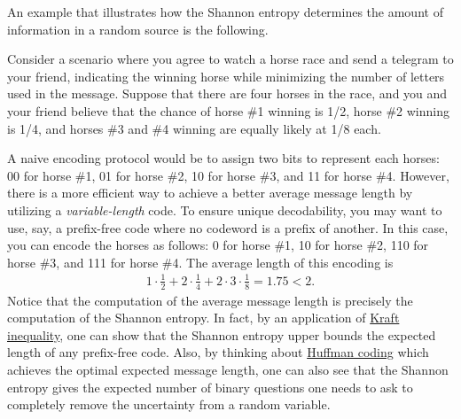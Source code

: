 \begin{example}\leavevmode
	
An example that illustrates how the Shannon entropy determines the amount of information in a random source is the following.
\vspace{0.5em}

Consider a scenario where you agree to watch a horse race and send a telegram to your friend, indicating the winning horse while minimizing the number of letters used in the message. 
Suppose that there are four horses in the race, and you and your friend believe that the chance of horse \#1 winning is 1/2, horse \#2 winning is 1/4, and horses \#3 and \#4 winning are equally likely at 1/8 each.
\vspace{0.5em}

A naive encoding protocol would be to assign two bits to represent each horses: 00 for horse \#1, 01 for horse \#2, 10 for horse \#3, and 11 for horse \#4. However, there is a more efficient way to achieve a better average message length by utilizing a \emph{variable-length} code. To ensure unique decodability, you may want to use, say, a prefix-free code where no codeword is a prefix of another. In this case, you can encode the horses as follows: 0 for horse \#1, 10 for horse \#2, 110 for horse \#3, and 111 for horse \#4. The average length of this encoding is
\begin{align}
	1\cdot \frac{1}{2} + 2\cdot \frac{1}{4} + 2\cdot 3\cdot \frac{1}{8} = 1.75 <2. 
\end{align}
Notice that the computation of the average message length is precisely the computation of the Shannon entropy. In fact, by an application of \href{https://en.wikipedia.org/wiki/Kraft%E2%80%93McMillan_inequality}{Kraft inequality}, one can show that the Shannon entropy upper bounds the expected length of any prefix-free code. Also, by thinking about   \href{https://en.wikipedia.org/wiki/Huffman_coding}{Huffman coding} which achieves the optimal expected message length, one can also see that the Shannon entropy gives the expected number of binary questions one needs to ask to completely remove the uncertainty from a random variable.
\end{example}

